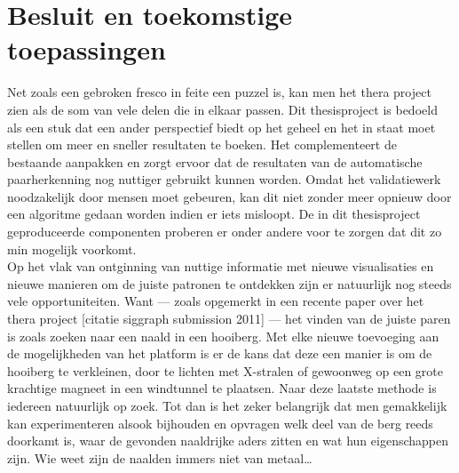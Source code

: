 \chapter{Besluit en toekomstige toepassingen}
\label{besluit}

Net zoals een gebroken fresco in feite een puzzel is, kan men het thera project zien als de som van vele delen die in elkaar passen. Dit thesisproject is bedoeld als een stuk dat een ander perspectief biedt op het geheel en het in staat moet stellen om meer en sneller resultaten te boeken. Het complementeert de bestaande aanpakken en zorgt ervoor dat de resultaten van de automatische paarherkenning nog nuttiger gebruikt kunnen worden. Omdat het validatiewerk noodzakelijk door mensen moet gebeuren, kan dit niet zonder meer opnieuw door een algoritme gedaan worden indien er iets misloopt. De in dit thesisproject geproduceerde componenten proberen er onder andere voor te zorgen dat dit zo min mogelijk voorkomt.\\

Op het vlak van ontginning van nuttige informatie met nieuwe visualisaties en nieuwe manieren om de juiste patronen te ontdekken zijn er natuurlijk nog steeds vele opportuniteiten. Want --- zoals opgemerkt in een recente paper over het thera project [citatie siggraph submission 2011] --- het vinden van de juiste paren is zoals zoeken naar een naald in een hooiberg. Met elke nieuwe toevoeging aan de mogelijkheden van het platform is er de kans dat deze een manier is om de hooiberg te verkleinen, door te lichten met X-stralen of gewoonweg op een grote krachtige magneet in een windtunnel te plaatsen. Naar deze laatste methode is iedereen natuurlijk op zoek. Tot dan is het zeker belangrijk dat men gemakkelijk kan experimenteren alsook bijhouden en opvragen welk deel van de berg reeds doorkamt is, waar de gevonden naaldrijke aders zitten en wat hun eigenschappen zijn. Wie weet zijn de naalden immers niet van metaal\ldots
 
